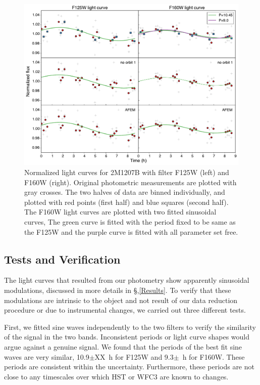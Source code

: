 \documentclass[apj]{emulateapj}
\begin{document}
\begin{figure}
  \centering
  \includegraphics[width=\textwidth]{systematics}
  \caption{Normalized light curves for 2M1207B with filter F125W
    (left) and F160W (right). Original photometric measurements are
    plotted with gray crosses. The two halves of data are binned
    individually, and plotted with red points (first half) and blue
    squares (second half). The F160W light curves are plotted with two
  fitted sinusoidal curves, The green curve is fitted with
  the period fixed to be same as the F125W and the purple curve is
  fitted with all parameter set free.}
  \label{fig:2}
\end{figure}

\subsection{Tests and Verification}

The light curves that resulted from our photometry show apparently sinusoidal modulations,
discussed in more details in \S,\ref{Results}. To verify that these modulations are intrinsic
to the object and not result of our data reduction procedure or due to instrumental changes, we carried out three different tests. 

First, we fitted sine waves independently to the two filters to verify the similarity of the signal in the two bands. Inconsistent periods or light curve shapes would argue against a genuine signal.
We found that the periods of the best fit sine waves are very similar, 10.9$\pm$XX~h
 for F125W and 9.3$\pm$~h for F160W. These periods are consistent within the uncertainty. Furthermore, these periods are not close to any timescales over which HST or WFC3 are known to changes. 
\end{document}
